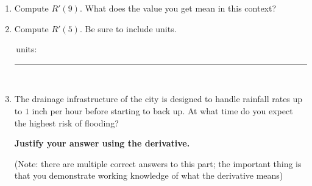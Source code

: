 \documentclass[11pt]{article}
\begin{document}
\begin{enumerate}
\begin{center}
\end{center}

\begin{enumerate}
    \item Compute $R'(9)$. What does the value you get mean in this context?

    \vspace{3cm}

    \item Compute $R'(5)$. Be sure to include units.

    \vspace{2cm}
            \,\hfill units: \rule{1.75in}{0.4pt}\\
    
    \item The drainage infrastructure of the city is designed to handle rainfall rates up to $1$ inch per hour before starting to back up. At what time do you expect the highest risk of flooding? 
    
    \textbf{Justify your answer using the derivative.}

    (Note: there are multiple correct answers to this part; the important thing is that you demonstrate working knowledge of what the derivative means)
\end{enumerate}



\newpage



\end{enumerate}
\end{document}
